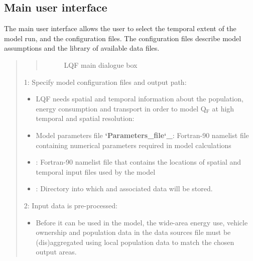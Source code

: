 \documentclass[letterpaper,10pt,english]{sphinxmanual}
\begin{document}
\subsection{Main user interface}
\label{\detokenize{OtherManuals/LQF_Manual:main-user-interface}}
The main user interface allows the user to select the temporal extent of
the model run, and the configuration files. The configuration files
describe model assumptions and the library of available data files.
\begin{quote}

\begin{quote}

\begin{figure}[htbp]
\centering
\capstart

\noindent{}
\caption{LQF main dialogue box}\label{\detokenize{OtherManuals/LQF_Manual:id1}}\end{figure}
\end{quote}

1: Specify model configuration files and output path:
\begin{itemize}
\item {} 
LQF needs spatial and temporal information about the population, energy consumption and transport in order to model Q$_{\text{F}}$ at high temporal and spatial resolution:

\item {} 
Model parameters file {\color{red}\bfseries{}{}`Parameters\_file{}`\_}: Fortran-90 namelist file containing numerical parameters required in model calculations

\item {} 
{\hyperref[\detokenize{OtherManuals/LQF_Manual:data-sources-file}]{}}: Fortran-90 namelist file that contains the locations of spatial and temporal input files used by the model

\item {} 
: Directory into which {\hyperref[\detokenize{OtherManuals/LQF_Manual:model-outputs}]{}} and associated data will be stored. 

\end{itemize}

2: Input data is pre-processed:
\begin{itemize}
\item {} 
Before it can be used in the model, the wide-area energy use, vehicle ownership and population data in the data sources file must be (dis)aggregated using local population data to match the chosen output areas.


\end{itemize}
\end{quote}
\end{document}
